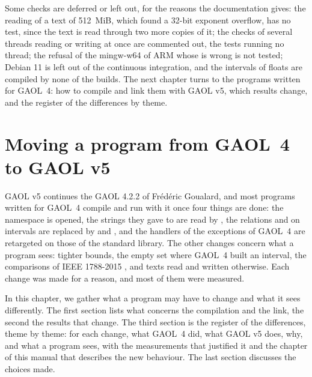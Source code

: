 \documentclass[12pt,a4paper,twoside,openright]{book}
\begin{document}
\medskip
Some checks are deferred or left out, for the reasons the documentation
gives: the reading of a text of 512~MiB, which found a 32-bit exponent
overflow, has no test, since the text is read through two more copies of
it; the checks of several threads reading or writing at once are commented
out, the tests running no thread; the refusal of the mingw-w64 of ARM whose
 is wrong is not tested; Debian 11 is left out of the
continuous integration, and the intervals of floats are compiled by none of
the builds. The next chapter turns to the programs written for GAOL~4: how
to compile and link them with GAOL v5, which results change, and the
register of the differences by theme.

\chapter{Moving a program from GAOL~4 to GAOL v5}\label{chap:changes}
%
%

GAOL v5 continues the GAOL 4.2.2 of Fr\'ed\'eric Goualard, and most programs
written for GAOL~4 compile and run with it once four things are done: the
namespace is opened, the strings they gave to 
are read by , the relations \code{==} and \code{!=} on
intervals are replaced by  and , and the
handlers of the exceptions of GAOL~4 are retargeted on those of the standard
library. The other changes concern what a program
sees: tighter bounds, the empty set where GAOL~4 built an interval, the
comparisons of IEEE 1788-2015 \cite{IEEE1788:2015}, and texts read and written
otherwise. Each change was made for a reason, and most of them were measured.

\medskip
In this chapter, we gather what a program may have to change and what it
sees differently. The first section lists what concerns the compilation and
the link, the second the results that change. The third section is the
register of the differences, theme by theme: for each change, what GAOL~4
did, what GAOL v5 does, why, and what a program sees, with the measurements
that justified it and the chapter of this manual that describes the new
behaviour. The last section discusses the choices made.
\end{document}
